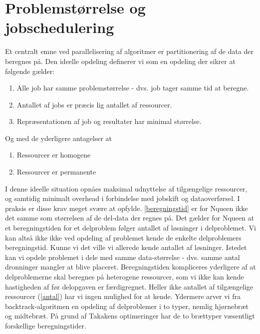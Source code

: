 \documentclass[pdf,draft,a4paper,10pt]{article}
\begin{document}
\section{Problemstørrelse og jobschedulering}
Et centralt emne ved parallelisering af algoritmer er partitionering af de data der beregnes på. Den ideelle opdeling definerer vi som en opdeling der sikrer at følgende gælder:
\begin{enumerate}
	\item Alle job har samme problemstørrelse - dvs. job tager samme tid at beregne.\label{beregningstid}
	\item Antallet af jobs er præcis lig antallet af ressourcer.\label{antal}
	\item Repræsentationen af job og resultater har minimal størrelse.\label{jobbeskrivelse}
\end{enumerate} 
Og med de yderligere antagelser at
\begin{enumerate}
	\item Ressourcer er homogene
	\item Ressourcer er permanente
\end{enumerate}
I denne ideelle situation opnåes maksimal udnyttelse af tilgængelige ressourcer, og samtidig minimalt overhead i forbindelse med jobskift og dataoverførsel.
I praksis er disse krav meget svære at opfylde. \ref{beregningstid} er for Nqueen ikke det samme som størrelsen af de del-data der regnes på. Det gælder for Nqueen at et beregningstiden for et delproblem følger antallet af løsninger i delproblemet. Vi kan altså ikke ikke ved opdeling af problemet kende de enkelte delproblemers beregningstid. Kunne vi det ville vi allerede kende antallet af løsninger. Istedet kan vi opdele problemet i dele med samme data-størrelse - dvs. samme antal dronninger mangler at blive placeret.   Beregningstiden kompliceres yderligere af at delproblemerne skal beregnes på heterogene ressourcer, som vi ikke kan kende hastigheden af før delopgaven er færdigregnet. Heller ikke antallet af tilgængelige ressourcer (\ref{antal}) har vi ingen mulighed for at kende. Ydermere arver vi fra backtrack-algoritmen en opdeling af delproblemer i to typer, nemlig hjørnebræt og midtebræt. På grund af Takakens optimeringer  har de to brættyper væsentligt forskellige beregningstider. 
\end{document}
